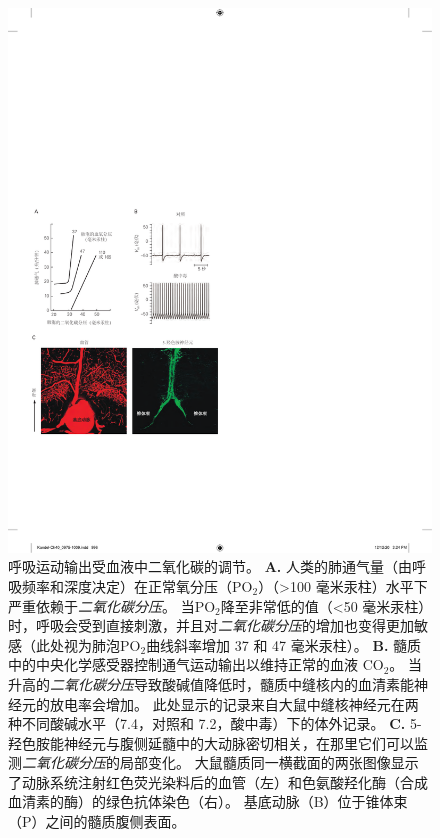 \begin{figure}[htbp]
	\centering
	\includegraphics[width=1.0\linewidth]{chap40/fig_40_9}
	\caption{呼吸运动输出受血液中二氧化碳的调节。
		\textbf{A.} 人类的肺通气量（由呼吸频率和深度决定）在正常氧分压（PO$_2$）（>100 毫米汞柱）水平下严重依赖于\textit{二氧化碳分压}。
		当PO$_2$降至非常低的值（<50 毫米汞柱）时，呼吸会受到直接刺激，并且对\textit{二氧化碳分压}的增加也变得更加敏感（此处视为肺泡PO$_2$曲线斜率增加 37 和 47 毫米汞柱）。
		\textbf{B.} 髓质中的中央化学感受器控制通气运动输出以维持正常的血液 CO$_2$。
		当升高的\textit{二氧化碳分压}导致酸碱值降低时，髓质中缝核内的血清素能神经元的放电率会增加。
		此处显示的记录来自大鼠中缝核神经元在两种不同酸碱水平（7.4，对照和 7.2，酸中毒）下的体外记录\cite{wang2002quantification}。
		\textbf{C.} 5-羟色胺能神经元与腹侧延髓中的大动脉密切相关，在那里它们可以监测\textit{二氧化碳分压}的局部变化。
		大鼠髓质同一横截面的两张图像显示了动脉系统注射红色荧光染料后的血管（左）和色氨酸羟化酶（合成血清素的酶）的绿色抗体染色（右）。
		基底动脉（B）位于锥体束（P）之间的髓质腹侧表面\cite{bradley2002chemosensitive}。}
	\label{fig:40_9}
\end{figure}


